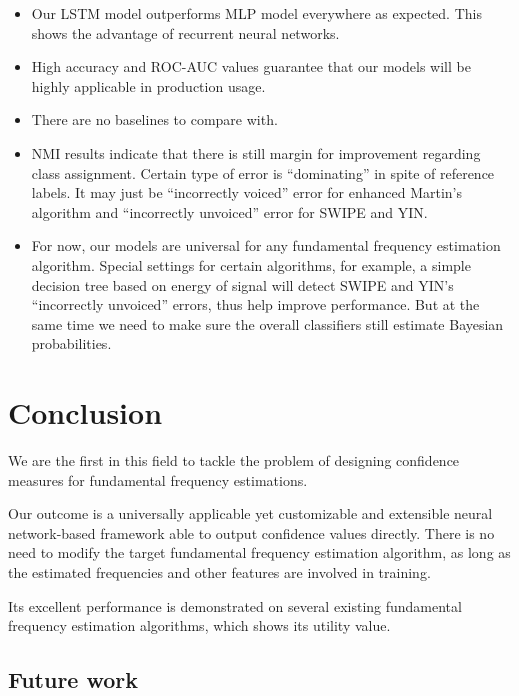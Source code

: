 \documentclass[11pt,a4paper]{report}
\begin{document}
\begin{itemize}
  \item Our LSTM model outperforms MLP model everywhere as expected.
    This shows the advantage of recurrent neural networks.
  \item High accuracy and ROC-AUC values guarantee that our models will be highly applicable in production usage.
  \item There are no baselines to compare with.

  \bigskip

  \item NMI results indicate that there is still margin for improvement regarding class assignment.
    Certain type of error is \enquote{dominating} in spite of reference labels.
    It may just be \enquote{incorrectly voiced} error for enhanced Martin's algorithm and \enquote{incorrectly unvoiced} error for SWIPE and YIN.
  \item For now, our models are universal for any fundamental frequency estimation algorithm.
    Special settings for certain algorithms, for example, a simple decision tree based on energy of signal will detect SWIPE and YIN's \enquote{incorrectly unvoiced} errors, thus help improve performance.
    But at the same time we need to make sure the overall classifiers still estimate Bayesian probabilities.
\end{itemize}

\chapter{Conclusion}

We are the first in this field to tackle the problem of designing confidence measures for fundamental frequency estimations.

Our outcome is a universally applicable yet customizable and extensible neural network-based framework able to output confidence values directly.
There is no need to modify the target fundamental frequency estimation algorithm, as long as the estimated frequencies and other features are involved in training.

Its excellent performance is demonstrated on several existing fundamental frequency estimation algorithms, which shows its utility value.

\section*{Future work}
\end{document}
